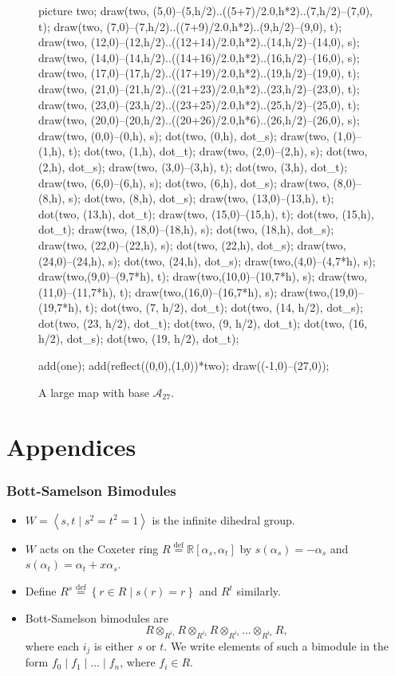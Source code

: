 \documentclass[pdf]{beamer}
\def\ii{\item}
\def\AA{\mathcal A}
\def\RR{\mathbb R}
\newcommand{\defeq}{\stackrel{\text{def}}{=}}
\begin{document}
\begin{frame}[fragile]
\begin{figure}[ht]
\begin{asy}
			picture two;
			draw(two, (5,0)--(5,h/2)..((5+7)/2.0,h*2)..(7,h/2)--(7,0), t);
			draw(two, (7,0)--(7,h/2)..((7+9)/2.0,h*2)..(9,h/2)--(9,0), t);
			draw(two, (12,0)--(12,h/2)..((12+14)/2.0,h*2)..(14,h/2)--(14,0), s);
			draw(two, (14,0)--(14,h/2)..((14+16)/2.0,h*2)..(16,h/2)--(16,0), s);
			draw(two, (17,0)--(17,h/2)..((17+19)/2.0,h*2)..(19,h/2)--(19,0), t);
			draw(two, (21,0)--(21,h/2)..((21+23)/2.0,h*2)..(23,h/2)--(23,0), t);
			draw(two, (23,0)--(23,h/2)..((23+25)/2.0,h*2)..(25,h/2)--(25,0), t);
			draw(two, (20,0)--(20,h/2)..((20+26)/2.0,h*6)..(26,h/2)--(26,0), s);
			draw(two, (0,0)--(0,h), s);
			dot(two, (0,h), dot_s);
			draw(two, (1,0)--(1,h), t);
			dot(two, (1,h), dot_t);
			draw(two, (2,0)--(2,h), s);
			dot(two, (2,h), dot_s);
			draw(two, (3,0)--(3,h), t);
			dot(two, (3,h), dot_t);
			draw(two, (6,0)--(6,h), s);
			dot(two, (6,h), dot_s);
			draw(two, (8,0)--(8,h), s);
			dot(two, (8,h), dot_s);
			draw(two, (13,0)--(13,h), t);
			dot(two, (13,h), dot_t);
			draw(two, (15,0)--(15,h), t);
			dot(two, (15,h), dot_t);
			draw(two, (18,0)--(18,h), s);
			dot(two, (18,h), dot_s);
			draw(two, (22,0)--(22,h), s);
			dot(two, (22,h), dot_s);
			draw(two, (24,0)--(24,h), s);
			dot(two, (24,h), dot_s);
			draw(two,(4,0)--(4,7*h), s);
			draw(two,(9,0)--(9,7*h), t);
			draw(two,(10,0)--(10,7*h), s);
			draw(two,(11,0)--(11,7*h), t);
			draw(two,(16,0)--(16,7*h), s);
			draw(two,(19,0)--(19,7*h), t);
			dot(two, (7, h/2), dot_t);
			dot(two, (14, h/2), dot_s);
			dot(two, (23, h/2), dot_t);
			dot(two, (9, h/2), dot_t);
			dot(two, (16, h/2), dot_s);
			dot(two, (19, h/2), dot_t);

			add(one); add(reflect((0,0),(1,0))*two);
			draw((-1,0)--(27,0));
		\end{asy}
		\caption{A large map with base $\AA_{27}$.}
		\label{fig:large_alt_example}
	\end{figure}
\end{frame}

\appendix
\section{Appendices}
\begin{frame}
	\frametitle{Bott-Samelson Bimodules}
	\begin{itemize}
		\ii $W = \left<s,t \mid s^2=t^2=1\right>$ is the infinite dihedral group.
		\ii $W$ acts on the Coxeter ring $R \defeq \RR[\alpha_s, \alpha_t]$ by $s(\alpha_s) = -\alpha_s$ and $s(\alpha_t) = \alpha_t + x\alpha_s$.
		\ii Define $R^s \defeq \left\{ r \in R \mid s(r) = r \right\}$ and $R^t$ similarly.
		\ii Bott-Samelson bimodules are \[ R \otimes_{R^{i_1}} R \otimes_{R^{i_2}} R \otimes_{R^{i_3}} \dots \otimes_{R^{i_n}} R, \]
where each $i_j$ is either $s$ or $t$.   We write elements of such a bimodule in the form $f_0 \mid f_1 \mid \dots \mid f_n$, where $f_i \in R$.
	\end{itemize}
\end{frame}
\end{document}
